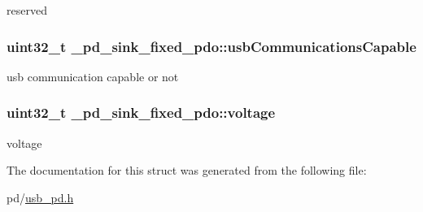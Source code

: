reserved \hypertarget{struct__pd__sink__fixed__pdo_aa19552768100717810142b8c4df3835c}{
\subsubsection[{usb\-Communications\-Capable}]{\setlength{\rightskip}{0pt plus 5cm}uint32\-\_\-t \-\_\-pd\-\_\-sink\-\_\-fixed\-\_\-pdo\-::usb\-Communications\-Capable}}\label{struct__pd__sink__fixed__pdo_aa19552768100717810142b8c4df3835c}
usb communication capable or not \hypertarget{struct__pd__sink__fixed__pdo_a5e095a725455f85faa43a1573e62b798}{
\subsubsection[{voltage}]{\setlength{\rightskip}{0pt plus 5cm}uint32\-\_\-t \-\_\-pd\-\_\-sink\-\_\-fixed\-\_\-pdo\-::voltage}}\label{struct__pd__sink__fixed__pdo_a5e095a725455f85faa43a1573e62b798}
voltage 

The documentation for this struct was generated from the following file\-:\begin{DoxyCompactItemize}
\item 
pd/\hyperlink{usb__pd_8h}{usb\-\_\-pd.\-h}\end{DoxyCompactItemize}
